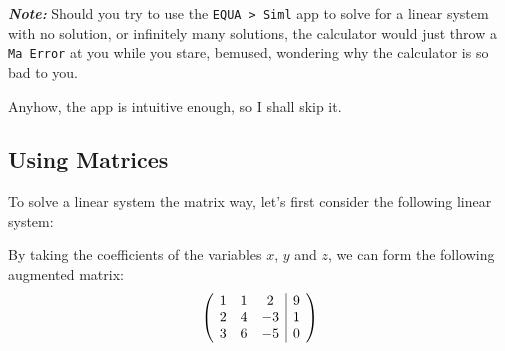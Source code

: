 \documentclass[a5paper,draft]{memoir}
\makeatletter
\newenvironment{amatrix}[1]{%
		\left(\hspace{0.15cm}\begin{array}{@{}*{#1}{c}|c@{}}
		}{%
	\end{array}\hspace{0.15cm}\right)
	}
\def\code#1{\texttt{#1}}
\def\note#1{\textbf{\textit{Note:}} #1}
\makeatother
\begin{document}
\note{Should you try to use the \code{EQUA > Siml} app to solve for a linear system with no solution, or infinitely many solutions, the calculator would just throw a \code{Ma Error} at you while you stare, bemused, wondering why the calculator is so bad to you.}

Anyhow, the app is intuitive enough, so I shall skip it.

\subsection{Using Matrices}

To solve a linear system the matrix way, let's first consider the following linear system:
\begin{center}
\end{center}

By taking the coefficients of the variables $x$, $y$ and $z$, we can form the following augmented matrix:
\[
	\begin{amatrix}{3}
		1 & 1 & 2  & 9 \\  
		2 & 4 & -3 & 1 \\
		3 & 6 & -5 & 0
	\end{amatrix}
\]
\end{document}
